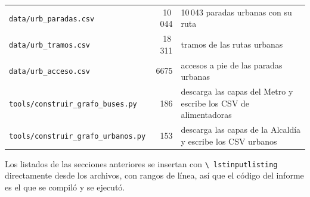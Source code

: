 \documentclass[11pt,a4paper]{article}
\newcommand{\arch}[1]{\texttt{#1}}
\begin{document}
\begin{center}
\begin{tabular}{lrp{8.4cm}}
\arch{data/urb\_paradas.csv} & 10\,044 & 10\,043 paradas urbanas con su ruta \\
\arch{data/urb\_tramos.csv}  & 18\,311 & tramos de las rutas urbanas \\
\arch{data/urb\_acceso.csv}  & 6675 & accesos a pie de las paradas urbanas \\
\arch{tools/construir\_grafo\_buses.py} & 186 & descarga las capas del Metro y escribe los CSV de alimentadoras \\
\arch{tools/construir\_grafo\_urbanos.py} & 153 & descarga las capas de la Alcaldía y escribe los CSV urbanos \\
\bottomrule
\end{tabular}
\end{center}

\noindent
Los listados de las secciones anteriores se insertan con \arch{\textbackslash
lstinputlisting} directamente desde los archivos, con rangos de línea, así que el
código del informe es el que se compiló y se ejecutó.
\end{document}
